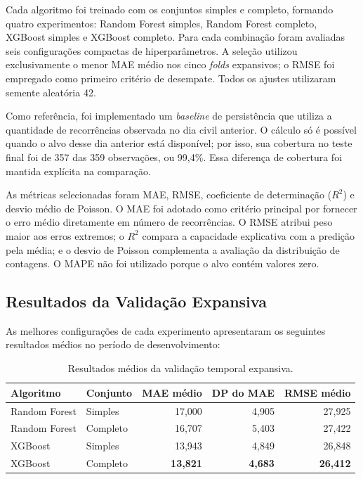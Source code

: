 Cada algoritmo foi treinado com os conjuntos simples e completo, formando quatro experimentos: Random Forest simples, Random Forest completo, XGBoost simples e XGBoost completo. Para cada combinação foram avaliadas seis configurações compactas de hiperparâmetros. A seleção utilizou exclusivamente o menor MAE médio nos cinco \textit{folds} expansivos; o RMSE foi empregado como primeiro critério de desempate. Todos os ajustes utilizaram semente aleatória 42.

Como referência, foi implementado um \textit{baseline} de persistência que utiliza a quantidade de recorrências observada no dia civil anterior. O cálculo só é possível quando o alvo desse dia anterior está disponível; por isso, sua cobertura no teste final foi de 357 das 359 observações, ou 99,4\%. Essa diferença de cobertura foi mantida explícita na comparação.

As métricas selecionadas foram MAE, RMSE, coeficiente de determinação ($R^2$) e desvio médio de Poisson. O MAE foi adotado como critério principal por fornecer o erro médio diretamente em número de recorrências. O RMSE atribui peso maior aos erros extremos; o $R^2$ compara a capacidade explicativa com a predição pela média; e o desvio de Poisson complementa a avaliação da distribuição de contagens. O MAPE não foi utilizado porque o alvo contém valores zero.

\subsection{Resultados da Validação Expansiva}

As melhores configurações de cada experimento apresentaram os seguintes resultados médios no período de desenvolvimento:

\begin{table}[htbp]
    \centering
    \caption{Resultados médios da validação temporal expansiva.}
    \label{tab:expanding-validation}
    \begin{tabular}{llrrr}
        \hline
        \textbf{Algoritmo} & \textbf{Conjunto} & \textbf{MAE médio} & \textbf{DP do MAE} & \textbf{RMSE médio} \\
        \hline
        Random Forest & Simples & 17,000 & 4,905 & 27,925 \\
        Random Forest & Completo & 16,707 & 5,403 & 27,422 \\
        XGBoost & Simples & 13,943 & 4,849 & 26,848 \\
        XGBoost & Completo & \textbf{13,821} & \textbf{4,683} & \textbf{26,412} \\
        \hline
    \end{tabular}
\end{table}

